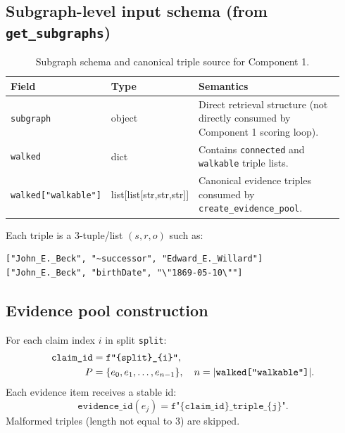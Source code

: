 \subsection{Subgraph-level input schema (from \texttt{get\_subgraphs})}
\begin{table}[H]
\centering
\begin{tabular}{@{}p{0.24\linewidth}p{0.16\linewidth}p{0.54\linewidth}@{}}
\toprule
Field & Type & Semantics \\
\midrule
\texttt{subgraph} & object & Direct retrieval structure (not directly consumed by Component 1 scoring loop). \\
\texttt{walked} & dict & Contains \texttt{connected} and \texttt{walkable} triple lists. \\
\texttt{walked["walkable"]} & list[list[str,str,str]] & Canonical evidence triples consumed by \texttt{create\_evidence\_pool}. \\
\bottomrule
\end{tabular}
\caption{Subgraph schema and canonical triple source for Component 1.}
\label{tab:c1_subgraph_schema}
\end{table}

Each triple is a 3-tuple/list $(s,r,o)$ such as:
\begin{lstlisting}[style=jsonstyle]
["John_E._Beck", "~successor", "Edward_E._Willard"]
["John_E._Beck", "birthDate", "\"1869-05-10\""]
\end{lstlisting}

\subsection{Evidence pool construction}
For each claim index $i$ in split \texttt{split}:
\begin{align}
\texttt{claim\_id} &= \texttt{f"\{split\}\_\{i\}"}, \\
P &= \{e_0, e_1, \dots, e_{n-1}\}, \quad n = |\texttt{walked["walkable"]}|.
\end{align}
Each evidence item receives a stable id:
\begin{equation}
\texttt{evidence\_id}(e_j) = \texttt{f"\{claim\_id\}\_triple\_\{j\}"}.
\end{equation}
Malformed triples (length not equal to 3) are skipped.

